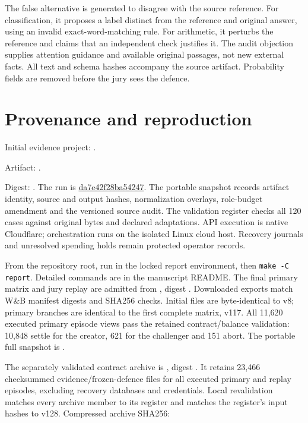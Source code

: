 The false alternative is generated to disagree with the source reference.
For classification, it proposes a label distinct from the reference and
original answer, using an invalid exact-word-matching rule. For arithmetic,
it perturbs the reference and claims that an independent check justifies it.
The audit objection supplies attention guidance and available original passages,
not new external facts. All text and schema hashes accompany the source
artifact. Probability fields are removed before the jury sees the defence.

\section{Provenance and reproduction}
\label{app:provenance}
Initial evidence project: .

Artifact: .

Digest: . The run is
\href{https://forge.coreweave.com/wandb/lbxa-corp/apart-epistemics-sprint/runs/da7e42f28ba54247}{da7e42f28ba54247}.
The portable snapshot records artifact identity, source and output hashes,
normalization overlays, role-budget amendment and the versioned source audit.
The validation register checks all 120 cases against original bytes and
declared adaptations. API execution is native Cloudflare; orchestration runs
on the isolated Linux cloud host. Recovery journals and unresolved spending
holds remain protected operator records.

From the repository root, run
 in the locked report environment,
then \texttt{make -C report}. Detailed commands are in the manuscript README.
The final primary matrix and jury replay are admitted from
, digest
. Downloaded exports match W\&B
manifest digests and SHA256 checks. Initial files are byte-identical to v8;
primary branches are identical to the first complete matrix, v117. All 11,620
executed primary episode views pass the retained contract/balance
validation: 10,848 settle for the creator, 621 for the challenger and 151
abort. The portable full snapshot is .

The separately validated contract archive is
, digest
. It retains 23,466 checksummed
evidence/frozen-defence files for all executed primary and replay episodes,
excluding recovery databases and credentials. Local revalidation matches every
archive member to its register and matches the register's input hashes to v128.
Compressed archive SHA256:

